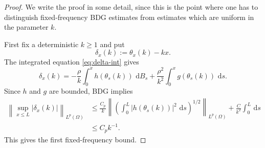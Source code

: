 \documentclass[10pt,a4paper]{amsart}
\newcommand{\dd}{\,\mathrm d}
\begin{document}
\begin{proof}
We write the proof in some detail, since this is the point where one has to distinguish fixed-frequency BDG estimates from estimates which are uniform in the parameter $k$.

First fix a deterministic $k\ge1$ and put
\[
    \delta_x(k):=\theta_x(k)-kx .
\]
The integrated equation \eqref{eq:delta-int} gives
\[
    \delta_x(k)
    =-\frac{\rho}{k}\int_0^x h(\theta_s(k))\,\dd B_s
      +\frac{\rho^2}{k^2}\int_0^x g(\theta_s(k))\,\dd s .
\]
Since $h$ and $g$ are bounded, BDG implies
\[
\begin{aligned}
    \left\|\sup_{x\le L}|\delta_x(k)|\right\|_{L^p(\Omega)}
    &\le \frac{C_p}{k}
       \left\|\left(\int_0^L |h(\theta_s(k))|^2\,\dd s\right)^{1/2}\right\|_{L^p(\Omega)}
       +\frac{C}{k^2}\int_0^L\dd s  \\
    &\le C_p k^{-1}.
\end{aligned}
\]
This gives the first fixed-frequency bound.


\end{proof}
\end{document}
